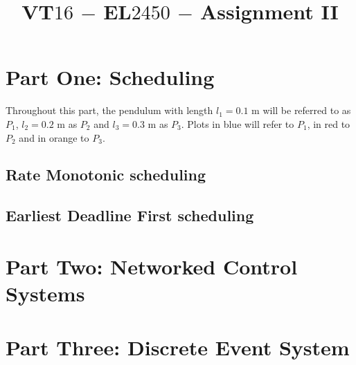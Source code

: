 \documentclass[oneside,12pt]{article}
\title{VT$16$ $-$ EL$2450$ $-$ Assignment II}
\author{
  \noindent\makebox[\textwidth][c]{
    \begin{minipage}{\linewidth}\centering
      \begin{minipage}{0.35\linewidth}\centering
        Alexandros Filotheou \\ 871108-5590 \\ alefil@kth.se
      \end{minipage}
      \begin{minipage}{0.35\linewidth}\centering
        Roberto Sanchez-Rey \\ 840616-9139\\ rosr@kth.se
      \end{minipage}
    \end{minipage}
  }}
\date{}
\begin{document}
	\maketitle

  \section{Part One: Scheduling}
    Throughout this part, the pendulum with length $l_1 = 0.1$ m will be
    referred to as $P_1$, $l_2 = 0.2$ m as $P_2$ and $l_3 = 0.3$ m as $P_3$.
    Plots in blue will refer to $P_1$, in red to $P_2$ and in orange to $P_3$.

  \subsection{Rate Monotonic scheduling}
    
    
    
    
    
    \newpage

  \subsection{Earliest Deadline First scheduling}
    
    
    
    
    
    
    \newpage

  \section{Part Two: Networked Control Systems}
    
    
    
    \newpage

  \section{Part Three: Discrete Event System}
    
    
    
    

  \newpage

  \appendix
  
\end{document}
